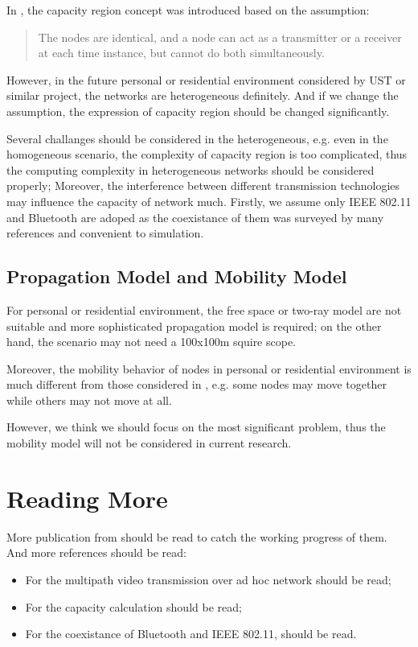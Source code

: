 \documentclass{IEEEtran}
\begin{document}
In \cite{bib:yoo_mmsp2004}, the capacity region concept was introduced based on the assumption:
\begin{quote}
	The nodes are identical, and a node can act as a transmitter or a receiver at each time instance, but cannot do both simultaneously.
\end{quote}
However, in the future personal or residential environment considered by UST or similar project, the networks are heterogeneous definitely. And if we change the assumption, the expression of capacity region should be changed significantly. 

Several challanges should be considered in the heterogeneous, e.g. even in the homogeneous scenario, the complexity of capacity region is too complicated, thus the computing complexity in heterogeneous networks should be considered properly; Moreover, the interference between different transmission technologies may influence the capacity of network much. Firstly, we assume only IEEE 802.11 and Bluetooth are adoped as the coexistance of them was surveyed by many references and convenient to simulation.

\subsection{Propagation Model and Mobility Model}

For personal or residential environment, the free space or two-ray model are not suitable and more sophisticated propagation model is required; on the other hand, the scenario may not need a 100x100m squire scope.

Moreover, the mobility behavior of nodes in personal or residential environment is much different from those considered in \cite{bib:yoo_mmsp2004}, e.g. some nodes may move together while others may not move at all.

However, we think we should focus on the most significant problem, thus the mobility model will not be considered in current research.

\section{Reading More}\label{sec:reading}

More publication from \cite{bib:crosslayer} should be read to catch the working progress of them. And more references should be read:
\begin{itemize}
	\item For the multipath video transmission over ad hoc network \cite{bib:mao_jsac2003,bib:royer_pcomm99} should be read;
	\item For the capacity calculation \cite{bib:toumpis_wiley2003} should be read;
	\item For the coexistance of Bluetooth and IEEE 802.11, \cite{bib:chias_infocomm2002} should be read.
\end{itemize}
\end{document}
